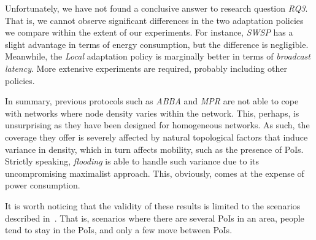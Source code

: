 Unfortunately, we have not found a conclusive answer to research question \textit{RQ3}.
%
That is, we cannot observe significant differences in the two adaptation policies we compare within the extent of our experiments.
%
For instance, \textit{SWSP} has a slight advantage in terms of energy consumption, but the difference is negligible.
%
Meanwhile, the \textit{Local} adaptation policy is marginally better in terms of \textit{broadcast latency}.
%
%
More extensive experiments are required, probably including other policies. %

In summary, previous protocols such as \textit{ABBA} and \textit{MPR} are not able to cope with networks where node density varies within the network. This, perhaps, is unsurprising as they have been designed for homogeneous networks. As such, the coverage they offer is severely affected by natural topological factors that induce variance in density, which in turn affects mobility, such as the presence of PoIs. 
Strictly speaking, \textit{flooding} is able to handle such variance due to its uncompromising maximalist approach. This, obviously, comes at the expense of power consumption.

%
It is worth noticing that the validity of these results is limited to the scenarios described in~.
%
That is, scenarios where there are several PoIs in an area, people tend to stay in the PoIs, and only a few move between PoIs. 
  

